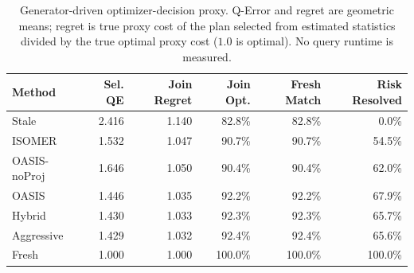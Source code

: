 \begin{table}[t]
  \centering
  \small
  \caption{Generator-driven optimizer-decision proxy. Q-Error and regret are geometric means; regret is true proxy cost of the plan selected from estimated statistics divided by the true optimal proxy cost ($1.0$ is optimal). No query runtime is measured.}
  \label{tab:optimizer_decision_proxy}
  \setlength{\tabcolsep}{4pt}
  \begin{tabular}{lrrrrr}
    \toprule
    Method & Sel. QE & Join Regret & Join Opt. & Fresh Match & Risk Resolved \\
    \midrule
    Stale & 2.416 & 1.140 & 82.8\% & 82.8\% & 0.0\% \\
    ISOMER & 1.532 & 1.047 & 90.7\% & 90.7\% & 54.5\% \\
    OASIS-noProj & 1.646 & 1.050 & 90.4\% & 90.4\% & 62.0\% \\
    OASIS & 1.446 & 1.035 & 92.2\% & 92.2\% & 67.9\% \\
    Hybrid & 1.430 & 1.033 & 92.3\% & 92.3\% & 65.7\% \\
    Aggressive & 1.429 & 1.032 & 92.4\% & 92.4\% & 65.6\% \\
    Fresh & 1.000 & 1.000 & 100.0\% & 100.0\% & 100.0\% \\
    \bottomrule
  \end{tabular}
\end{table}
